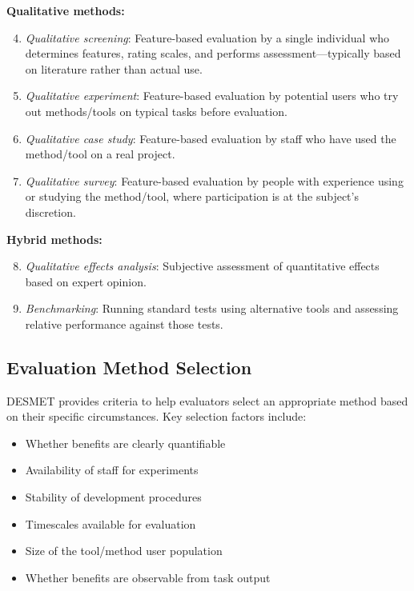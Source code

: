 \documentclass[]
{UCD_CS_FYP_Report}
\begin{document}
\textbf{Qualitative methods:}
\begin{enumerate}
  \setcounter{enumi}{3}
  \item \textit{Qualitative screening}: Feature-based evaluation by a single individual who determines features, rating scales, and performs assessment---typically based on literature rather than actual use.
  \item \textit{Qualitative experiment}: Feature-based evaluation by potential users who try out methods/tools on typical tasks before evaluation.
  \item \textit{Qualitative case study}: Feature-based evaluation by staff who have used the method/tool on a real project.
  \item \textit{Qualitative survey}: Feature-based evaluation by people with experience using or studying the method/tool, where participation is at the subject's discretion.
\end{enumerate}

\textbf{Hybrid methods:}
\begin{enumerate}
  \setcounter{enumi}{7}
  \item \textit{Qualitative effects analysis}: Subjective assessment of quantitative effects based on expert opinion.
  \item \textit{Benchmarking}: Running standard tests using alternative tools and assessing relative performance against those tests.
\end{enumerate}

\subsection{Evaluation Method Selection}

DESMET provides criteria to help evaluators select an appropriate method based on their specific circumstances. Key selection factors include:

\begin{itemize}
  \item Whether benefits are clearly quantifiable
  \item Availability of staff for experiments
  \item Stability of development procedures
  \item Timescales available for evaluation
  \item Size of the tool/method user population
  \item Whether benefits are observable from task output
\end{itemize}
\end{document}

